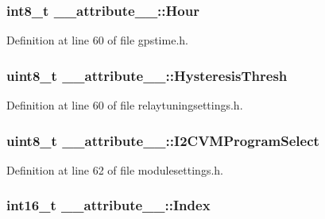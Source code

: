 \hypertarget{struct____attribute_____a55359118dfe602519ab7ee5a331c64a0}{
\subsubsection[{\-Hour}]{\setlength{\rightskip}{0pt plus 5cm}int8\-\_\-t {\bf \-\_\-\-\_\-attribute\-\_\-\-\_\-\-::\-Hour}}}\label{struct____attribute_____a55359118dfe602519ab7ee5a331c64a0}


\-Definition at line 60 of file gpstime.\-h.

\hypertarget{struct____attribute_____adaa69547dc164c300a970e8ec282fc3f}{
\subsubsection[{\-Hysteresis\-Thresh}]{\setlength{\rightskip}{0pt plus 5cm}uint8\-\_\-t {\bf \-\_\-\-\_\-attribute\-\_\-\-\_\-\-::\-Hysteresis\-Thresh}}}\label{struct____attribute_____adaa69547dc164c300a970e8ec282fc3f}


\-Definition at line 60 of file relaytuningsettings.\-h.

\hypertarget{struct____attribute_____a96251c39ee3061820ae8aeb66ca5713f}{
\subsubsection[{\-I2\-C\-V\-M\-Program\-Select}]{\setlength{\rightskip}{0pt plus 5cm}uint8\-\_\-t {\bf \-\_\-\-\_\-attribute\-\_\-\-\_\-\-::\-I2\-C\-V\-M\-Program\-Select}}}\label{struct____attribute_____a96251c39ee3061820ae8aeb66ca5713f}


\-Definition at line 62 of file modulesettings.\-h.

\hypertarget{struct____attribute_____a6ec957682da0359d711b1c56dcec5428}{
\subsubsection[{\-Index}]{\setlength{\rightskip}{0pt plus 5cm}int16\-\_\-t {\bf \-\_\-\-\_\-attribute\-\_\-\-\_\-\-::\-Index}}}\label{struct____attribute_____a6ec957682da0359d711b1c56dcec5428}



